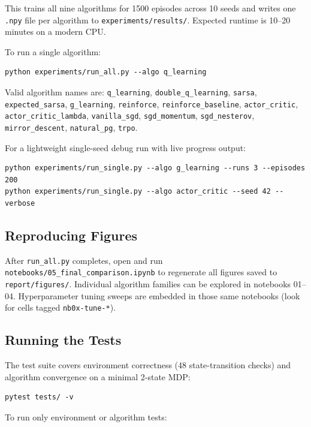 \documentclass[11pt]{article}
\begin{document}
This trains all nine algorithms for 1500 episodes across 10 seeds and writes
one \texttt{.npy} file per algorithm to \texttt{experiments/results/}.
Expected runtime is 10--20 minutes on a modern CPU.

To run a single algorithm:

\begin{verbatim}
python experiments/run_all.py --algo q_learning
\end{verbatim}

Valid algorithm names are: \texttt{q\_learning}, \texttt{double\_q\_learning},
\texttt{sarsa}, \texttt{expected\_sarsa}, \texttt{g\_learning},
\texttt{reinforce}, \texttt{reinforce\_baseline}, \texttt{actor\_critic},
\texttt{actor\_critic\_lambda}, \texttt{vanilla\_sgd}, \texttt{sgd\_momentum},
\texttt{sgd\_nesterov}, \texttt{mirror\_descent}, \texttt{natural\_pg},
\texttt{trpo}.

For a lightweight single-seed debug run with live progress output:

\begin{verbatim}
python experiments/run_single.py --algo g_learning --runs 3 --episodes 200
python experiments/run_single.py --algo actor_critic --seed 42 --verbose
\end{verbatim}

\subsection*{Reproducing Figures}

After \texttt{run\_all.py} completes, open and run
\texttt{notebooks/05\_final\_comparison.ipynb} to regenerate all figures saved
to \texttt{report/figures/}.  Individual algorithm families can be explored in
notebooks 01--04.  Hyperparameter tuning sweeps are embedded in those same
notebooks (look for cells tagged \texttt{nb0x-tune-*}).

\subsection*{Running the Tests}

The test suite covers environment correctness (48 state-transition checks) and
algorithm convergence on a minimal 2-state MDP:

\begin{verbatim}
pytest tests/ -v
\end{verbatim}

To run only environment or algorithm tests:
\end{document}
